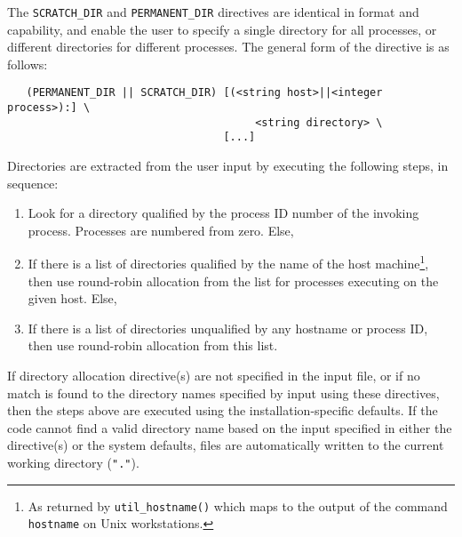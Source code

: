 The \verb+SCRATCH_DIR+ and \verb+PERMANENT_DIR+ directives are
identical in format and capability, and enable the user to specify a
single directory for all processes, or different directories for
different processes.  The general form of the directive is as follows:

\begin{verbatim}
   (PERMANENT_DIR || SCRATCH_DIR) [(<string host>||<integer process>):] \
                                       <string directory> \ 
                                  [...]
\end{verbatim}

Directories are extracted from the user input by executing the
following steps, in sequence:
\begin{enumerate}
\item Look for a directory qualified by the process ID number of the
  invoking process.  Processes are numbered from zero.  Else,
\item If there is a list of directories qualified by the name of the
  host machine\footnote{As returned by {\tt util\_hostname()} which
    maps to the output of the command {\tt hostname} on Unix
    workstations.}, then use round-robin allocation from the list for
  processes executing on the given host.  Else, 
\item If there is a list of directories unqualified by any hostname
  or process ID, then use round-robin allocation from this list.
\end{enumerate}
If directory allocation directive(s) are not specified in the input
file, or if no match is found to the directory names specified by
input using these directives, then the  steps above are executed using
the installation-specific defaults.  If the code cannot find a valid
directory name based on the input specified in either the directive(s)
or the system defaults, files are automatically written to the current
working directory (\verb+"."+).

